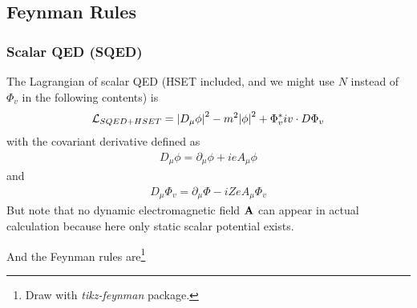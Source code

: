 \documentclass[aps,prd,preprint,showkeys,10pt]{revtex4-1}
\newcommand{\lag}{\mathcal{L}}
\begin{document}
\subsection{Feynman Rules}
\subsubsection{Scalar QED (SQED)}
The Lagrangian of scalar QED (HSET included, and we might use $N$ instead of $\Phi_v$ in the following contents) is
\begin{align}
	\lag_{SQED+HSET}=\abs{D_{\mu}\phi}^2-m^2\abs{\phi}^2+\Phi_v^*iv\cdot D\Phi_v
	\label{SQEDLAG}
\end{align}
with the covariant derivative defined as
\begin{align*}
	D_{\mu}\phi=\partial_{\mu}\phi+ieA_{\mu}\phi
\end{align*}
and
\begin{align*}
	D_{\mu}\Phi_v=\partial_{\mu}\Phi-iZeA_{\mu}\Phi_v
\end{align*}
But note that no dynamic electromagnetic field $\vb{A}$ can appear in actual calculation because here only static scalar potential exists.

And the Feynman rules are\footnote{Draw with \emph{tikz-feynman} package\cite{Ellis2016}.}
\end{document}
